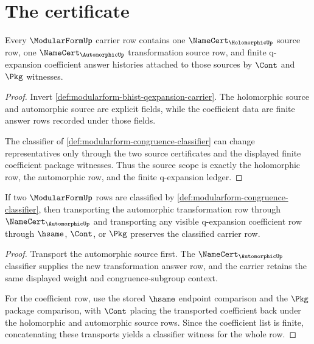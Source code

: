 \section{The certificate}
\label{sec:modularform-certificate}

\begin{theorem}
\label{thm:modularform-holomorphic-source-scope}
Every $\ModularFormUp$ carrier row contains one $\NameCert_{\HolomorphicUp}$ source row, one $\NameCert_{\AutomorphicUp}$ transformation source row, and finite q-expansion coefficient answer histories attached to those sources by $\Cont$ and $\Pkg$ witnesses.
\end{theorem}
\begin{proof}
Invert \autoref{def:modularform-bhist-qexpansion-carrier}. The holomorphic source and automorphic source are explicit fields, while the coefficient data are finite answer rows recorded under those fields.

The classifier of \autoref{def:modularform-congruence-classifier} can change representatives only through the two source certificates and the displayed finite coefficient package witnesses. Thus the source scope is exactly the holomorphic row, the automorphic row, and the finite q-expansion ledger.
\end{proof}

\begin{theorem}
\label{thm:modularform-automorphic-transport-stability}
If two $\ModularFormUp$ rows are classified by \autoref{def:modularform-congruence-classifier}, then transporting the automorphic transformation row through $\NameCert_{\AutomorphicUp}$ and transporting any visible q-expansion coefficient row through $\hsame$, $\Cont$, or $\Pkg$ preserves the classified carrier row.
\end{theorem}
\begin{proof}
Transport the automorphic source first. The $\NameCert_{\AutomorphicUp}$ classifier supplies the new transformation answer row, and the carrier retains the same displayed weight and congruence-subgroup context.

For the coefficient row, use the stored $\hsame$ endpoint comparison and the $\Pkg$ package comparison, with $\Cont$ placing the transported coefficient back under the holomorphic and automorphic source rows. Since the coefficient list is finite, concatenating these transports yields a classifier witness for the whole row.
\end{proof}

